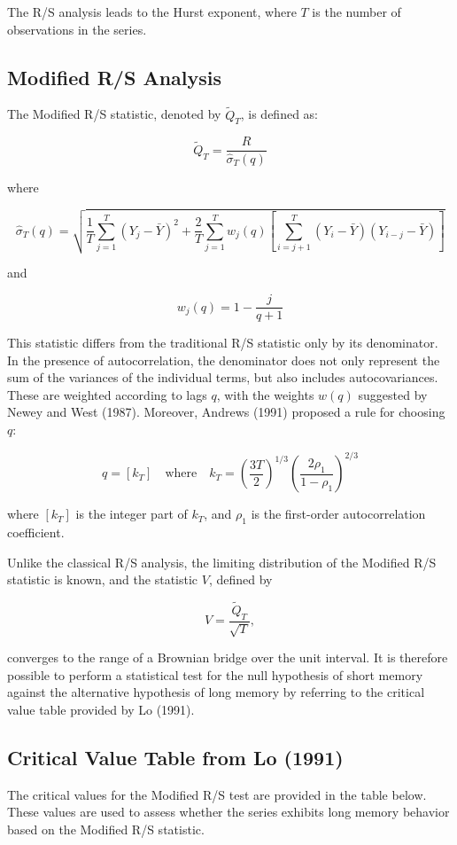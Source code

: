 \documentclass[11pt]{extarticle}
\begin{document}
The R/S analysis leads to the Hurst exponent, where $T$ is the number of observations in the series.

\subsection{Modified R/S Analysis}
The Modified R/S statistic, denoted by $\tilde{Q}_T$, is defined as:

\[
\tilde{Q}_T = \frac{R}{\hat{\sigma}_T(q)}
\]

where

\[
\hat{\sigma}_T(q) = \sqrt{\frac{1}{T} \sum_{j=1}^{T} (Y_j - \bar{Y})^2 + \frac{2}{T} \sum_{j=1}^{T} w_j(q) \left[ \sum_{i=j+1}^{T} (Y_i - \bar{Y})(Y_{i-j} - \bar{Y}) \right]}
\]

and

\[
w_j(q) = 1 - \frac{j}{q + 1}
\]

This statistic differs from the traditional R/S statistic only by its denominator. In the presence of autocorrelation, the denominator does not only represent the sum of the variances of the individual terms, but also includes autocovariances.
These are weighted according to lags $q$, with the weights $w(q)$ suggested by Newey and West (1987). Moreover, Andrews (1991) proposed a rule for choosing $q$:

\[
q = \left[ k_T \right] \quad \text{where} \quad k_T = \left( \frac{3T}{2} \right)^{1/3} \left( \frac{2 \rho_1}{1 - \rho_1} \right)^{2/3}
\]

where $[k_T]$ is the integer part of $k_T$, and $\rho_1$ is the first-order autocorrelation coefficient.

Unlike the classical R/S analysis, the limiting distribution of the Modified R/S statistic is known, and the statistic $V$, defined by

\[
V = \frac{\tilde{Q}_T}{\sqrt{T}},
\]

converges to the range of a Brownian bridge over the unit interval. It is therefore possible to perform a statistical test for the null hypothesis of short memory against the alternative hypothesis of long memory by referring to the critical value table provided by Lo (1991).

\subsection{Critical Value Table from Lo (1991)}
The critical values for the Modified R/S test are provided in the table below. These values are used to assess whether the series exhibits long memory behavior based on the Modified R/S statistic.
\end{document}
